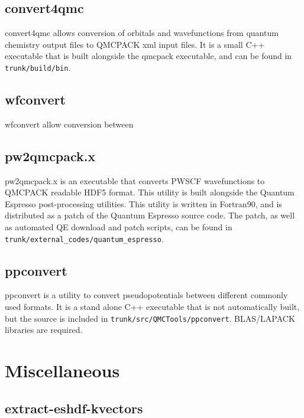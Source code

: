   \subsection{convert4qmc}
    convert4qmc allows conversion of orbitals and wavefunctions from quantum chemistry
    output files to QMCPACK xml input files.  It is a small C++ executable that is built 
    alongside the qmcpack executable, and can be found in \texttt{trunk/build/bin}.  
  \subsection{wfconvert}
    wfconvert allow conversion between 
  \subsection{pw2qmcpack.x}
    pw2qmcpack.x is an executable that converts PWSCF wavefunctions to QMCPACK readable 
    HDF5 format.  This utility is built alongside the Quantum Espresso post-processing utilities.
    This utility is written in Fortran90, and is distributed as a patch of the Quantum Espresso 
    source code.  The patch, as well as automated QE download and patch scripts, can be found in 
    \texttt{trunk/external\_codes/quantum\_espresso}.
  \subsection{ppconvert}
    ppconvert is a utility to convert pseudopotentials between different commonly used formats.
    It is a stand alone C++ executable that is not automatically built, but the source is 
    included in \texttt{trunk/src/QMCTools/ppconvert}.  BLAS/LAPACK libraries are required.  

\section{Miscellaneous}
  \subsection{extract-eshdf-kvectors}
    

